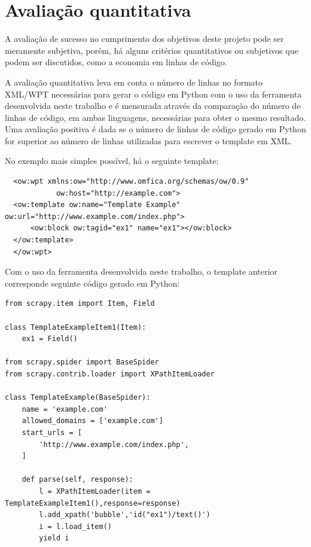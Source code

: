 \section{Avaliação quantitativa}

A avaliação de sucesso no cumprimento dos objetivos deste projeto pode ser meramente subjetiva, porém, há alguns critérios quantitativos ou subjetivos que podem ser discutidos, como a economia em linhas de código. 

A avaliação quantitativa leva em conta o número de linhas no formato XML/WPT necessárias para gerar o código em Python com o uso da ferramenta desenvolvida neste trabalho e é mensurada através da comparação do número de linhas de código, em ambas linguagens, necessárias para obter o mesmo resultado. Uma avaliação positiva é dada se o número de linhas de código gerado em Python for superior ao número de linhas utilizadas para escrever o template em XML.

No exemplo mais simples possível, há o seguinte template:

\begin{lstlisting}
  <ow:wpt xmlns:ow="http://www.omfica.org/schemas/ow/0.9"
            ow:host="http://example.com">
  <ow:template ow:name="Template Example" ow:url="http://www.example.com/index.php">
      <ow:block ow:tagid="ex1" name="ex1"></ow:block>
  </ow:template> 
  </ow:wpt>
\end{lstlisting}

Com o uso da ferramenta desenvolvida neste trabalho, o template anterior corresponde seguinte código gerado em Python:

\begin{lstlisting}
from scrapy.item import Item, Field

class TemplateExampleItem1(Item):
    ex1 = Field()

from scrapy.spider import BaseSpider
from scrapy.contrib.loader import XPathItemLoader

class TemplateExample(BaseSpider):
    name = 'example.com'
    allowed_domains = ['example.com']
    start_urls = [
        'http://www.example.com/index.php',
    ]
    
    def parse(self, response):
        l = XPathItemLoader(item = TemplateExampleItem1(),response=response)
        l.add_xpath('bubble','id("ex1")/text()') 
        i = l.load_item()
        yield i
\end{lstlisting}

